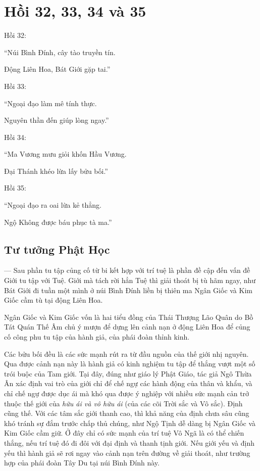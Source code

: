 \chapter{Hồi 32, 33, 34 và 35} %
\label{cha:hoi_33_34}

Hồi 32:

\begin{itshape}
``Núi Bình Đính, cây tào truyền tín.

Động Liên Hoa, Bát Giới gặp tai.''
\end{itshape}

Hồi 33:

\begin{itshape}
``Ngoại đạo làm mê tính thực.

Nguyên thần đến giúp lòng ngay.''
\end{itshape}

Hồi 34:

\begin{itshape}
``Ma Vương mưu giỏi khốn Hầu Vương.

Đại Thánh khéo lừa lấy bửu bối.''
\end{itshape}

Hồi 35:

\begin{itshape}
``Ngoại đạo ra oai lừa kẻ thẳng.

Ngộ Không được báu phục tà ma.''
\end{itshape}

\section{Tư tưởng Phật Học} %
\label{sec:33_34_phat_hoc}

--- Sau phần tu tập củng cố từ bi kết hợp với trí tuệ là phần đề cập đến vấn đề Giới tu tập với Tuệ. Giới mà tách rời hẳn Tuệ thì giải thoát bị tù hãm ngay, như Bát Giới đi tuần một mình ở núi Bình Đính liền bị thiên ma Ngân Giốc và Kim Giốc cầm tù tại động Liên Hoa.

Ngân Giốc và Kim Giốc vốn là hai tiểu đồng của Thái Thượng Lão Quân do Bồ Tát Quán Thế Âm chủ ý mượn để dựng lên cảnh nạn ở động Liên Hoa để củng cố công phu tu tập của hành giả, của phái đoàn thỉnh kinh.

Các bửu bối đều là các sức mạnh rút ra từ đầu nguồn của thế giới nhị nguyên. Qua được cảnh nạn này là hành giả có kinh nghiệm tu tập để thắng vượt một số trói buộc của Tam giới. Tại đây, đúng như giáo lý Phật Giáo, tác giả Ngô Thừa Ân xác định vai trò của giới chỉ để chế ngự các hành động của thân và khẩu, và chỉ chế ngự được dục ái mà khó qua được ý nghiệp với nhiều sức mạnh cản trở thuộc thế giới của \emph{hữu ái và vô hữu ái} (của các cõi Trời sắc và Vô sắc). Định cũng thế. Với các tâm sắc giới thanh cao, thì khả năng của định chưa sâu cũng khó tránh sự đắm trước chấp thủ chúng, như Ngộ Tịnh dễ dàng bị Ngân Giốc và Kim Giốc cầm giữ. Ở đây chỉ có sức mạnh của trí tuệ Vô Ngã là có thể chiến thắng, nếu trí tuệ đó đi đôi với đại định và thanh tịnh giới. Nếu giới yếu và định yếu thì hành giả sẽ rơi ngay vào cảnh nạn trên đường về giải thoát, như trường hợp của phái đoàn Tây Du tại núi Bình Đính này.

